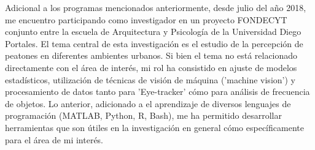 \documentclass[11pt]{article}
\begin{document}
Adicional a los programas mencionados anteriormente, desde julio del año 2018,
me encuentro participando como investigador en un proyecto FONDECYT conjunto
entre la escuela de Arquitectura y Psicología de la Universidad Diego
Portales. El tema central de esta investigación es el estudio de la percepción
de peatones en diferentes ambientes urbanos. Si bien el tema no está
relacionado directamente con el área de interés, mi rol ha consistido en
ajuste de modelos estadísticos, utilización de técnicas de visión de máquina
('machine vision') y procesamiento de datos tanto para 'Eye-tracker' cómo para
análisis de frecuencia de objetos. Lo anterior, adicionado a el aprendizaje de
diversos lenguajes de programación (MATLAB, Python, R, Bash), me ha permitido
desarrollar herramientas que son útiles en la investigación en general cómo
específicamente para el área de mi interés.
\begin{Latex}
\pagebreak
\end{Latex}


\end{document}
